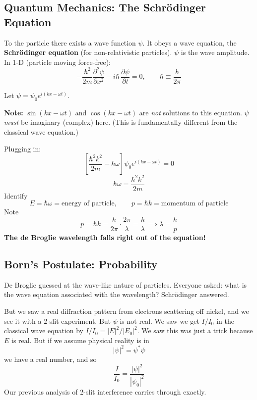 \documentclass[11pt]{report}
\begin{document}
\subsection*{Quantum Mechanics: The Schr\"odinger Equation}

To the particle there exists a wave function $\psi$. It obeys a wave equation, the \textbf{Schr\"odinger equation} (for non-relativistic particles). $\psi$ is the wave amplitude. In 1-D (particle moving force-free):
\begin{equation}
\boxed{-\frac{\hbar^2}{2m}\frac{\partial^2 \psi}{\partial x^2} - i\hbar\,\frac{\partial\psi}{\partial t} = 0, \qquad \hbar \equiv \frac{h}{2\pi}}
\end{equation}

Let $\psi = \psi_0 e^{i(kx-\omega t)}$.

\textbf{Note:} $\sin(kx-\omega t)$ and $\cos(kx-\omega t)$ are \emph{not} solutions to this equation. $\psi$ \emph{must} be imaginary (complex) here. (This is fundamentally different from the classical wave equation.)

Plugging in:
\begin{equation}
\left[\frac{\hbar^2 k^2}{2m} - \hbar\omega\right]\psi_0 e^{i(kx-\omega t)} = 0
\end{equation}
\begin{equation}
\hbar\omega = \frac{\hbar^2 k^2}{2m}
\end{equation}
Identify
\begin{equation}
\boxed{E = \hbar\omega = \text{energy of particle}, \qquad p = \hbar k = \text{momentum of particle}}
\end{equation}
Note
\begin{equation}
p = \hbar k = \frac{h}{2\pi}\cdot\frac{2\pi}{\lambda} = \frac{h}{\lambda} \implies \lambda = \frac{h}{p}
\end{equation}
\textbf{The de Broglie wavelength falls right out of the equation!}

\subsection*{Born's Postulate: Probability}

De Broglie guessed at the wave-like nature of particles. Everyone asked: what is the wave equation associated with the wavelength? Schr\"odinger answered.

But we saw a real diffraction pattern from electrons scattering off nickel, and we see it with a 2-slit experiment. But $\psi$ is not real. We saw we get $I/I_0$ in the classical wave equation by $I/I_0 = |E|^2/|E_0|^2$. We saw this was just a trick because $E$ is real. But if we assume physical reality is in
\begin{equation}
\boxed{|\psi|^2 = \psi^*\psi}
\end{equation}
we have a real number, and so
\begin{equation}
\frac{I}{I_0} = \frac{|\psi|^2}{|\psi_0|^2}
\end{equation}
Our previous analysis of 2-slit interference carries through exactly.
\end{document}
